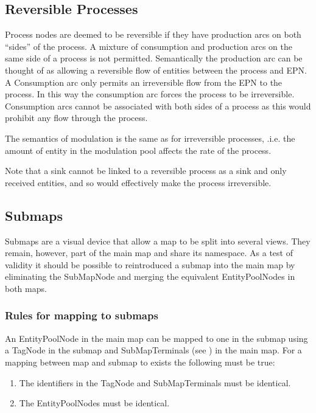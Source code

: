 \subsection{Reversible Processes}
\label{sec: semantics reversible procs}

Process nodes are deemed to be reversible if they have production arcs on both ``sides'' of the process. A mixture of consumption and production arcs on the same side of a process is not permitted. Semantically the production arc can be thought of as allowing a reversible flow of entities between the process and EPN. A Consumption arc only permits an irreversible flow from the EPN to the process. In this way the consumption arc forces the process to be irreversible. Consumption arcs cannot be associated with both sides of a process as this would prohibit any flow through the process.

The semantics of modulation is the same as for irreversible processes, .i.e. the amount of entity in the modulation pool affects the rate of the process.

Note that a sink cannot be linked to a reversible process as a sink and only received entities, and so would effectively make the process irreversible.

\subsection{Submaps}

Submaps are a visual device that allow a map to be split into several
views. They remain, however, part of the main map and share its
namespace. As a test of validity it should be possible to reintroduced
a submap into the main map by eliminating the SubMapNode and merging
the equivalent EntityPoolNodes in both maps.

\subsubsection{Rules for mapping to submaps}

An EntityPoolNode in the main map can be mapped to one in the submap
using a TagNode in the submap and SubMapTerminals (see ) in the main map. For a
mapping between map and submap to exists the following must be true:

\begin{enumerate}
\item The identifiers in the TagNode and SubMapTerminals must be identical.
\item The EntityPoolNodes must be identical.
\end{enumerate}

